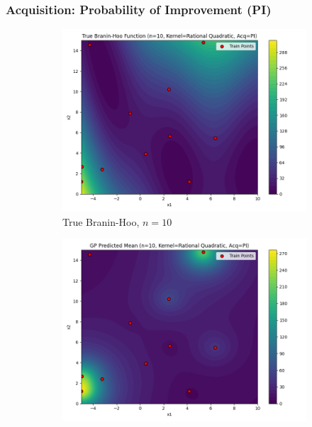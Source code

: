 \documentclass[a4paper,12pt]{article}
\begin{document}
\subsubsection*{Acquisition: Probability of Improvement (PI)}
\begin{figure}[H]
\centering

\begin{subfigure}{0.3\textwidth}
  \includegraphics[width=\linewidth]{Task-02/images/true_function_rational_quadratic_n10_PI.png}
  \caption{True Branin-Hoo, $n=10$}
\end{subfigure}
\begin{subfigure}{0.3\textwidth}
    \includegraphics[width=\linewidth]{Task-02/images/gp_mean_rational_quadratic_n10_PI.png}

\end{subfigure}
\end{figure}
\end{document}
